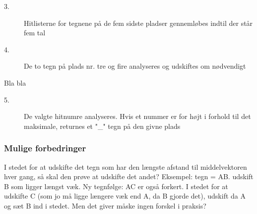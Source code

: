 \begin{description}
\item[3.] Hitlisterne for tegnene på de fem sidste pladser gennemløbes indtil der står fem tal
\item[4.] De to tegn på plads nr. tre og fire analyseres og udskiftes om nødvendigt
\end{description}

Bla bla

\begin{description}
\item[5.] De valgte hitnumre analyseres. Hvis et nummer er for højt i forhold til det maksimale, returnes et "\_" tegn på den givne plads
\end{description}

\subsubsection{Mulige forbedringer}
I stedet for at udskifte det tegn som har den længste afstand til middelvektoren hver gang, så skal den prøve at udskifte det andet? Eksempel: tegn = AB. udskift B som ligger længst væk. Ny tegnfølge: AC er også forkert. I stedet for at udskifte C (som jo må ligge længere væk end A, da B gjorde det), udskift da A og sæt B ind i stedet. Men det giver måske ingen forskel i praksis?